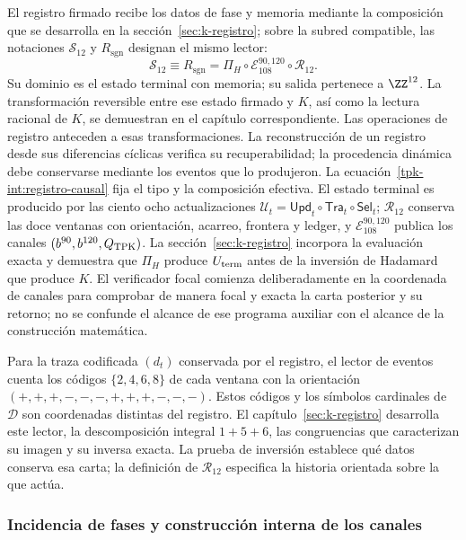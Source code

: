 El registro firmado recibe los datos de fase y memoria mediante la
composición que se desarrolla en la sección~\ref{sec:k-registro}; sobre la
subred compatible, las notaciones \(\mathcal S_{12}\) y
\(R_{\mathrm{sgn}}\) designan el mismo lector:
\begin{equation}
 \mathcal S_{12}\equiv R_{\mathrm{sgn}}
 =\Pi_H\circ\mathcal E_{108}^{90,120}
                         \circ\mathcal R_{12}.
 \label{tpk-int:registro-causal}
\end{equation}
Su dominio es el estado terminal con memoria; su salida pertenece a
\(\ZZ^{12}\). La transformación reversible entre ese estado firmado
y \(K\), así como la lectura racional de \(K\), se demuestran en
el capítulo correspondiente. Las operaciones de registro anteceden a
esas transformaciones. La reconstrucción de un registro desde sus
diferencias cíclicas verifica su recuperabilidad; la procedencia dinámica
debe conservarse mediante los eventos que lo produjeron.
La ecuación~\eqref{tpk-int:registro-causal} fija el tipo y la composición
efectiva. El estado terminal es producido por las ciento ocho actualizaciones
\(\mathcal U_t=\mathsf{Upd}_t\circ\mathsf{Tra}_t\circ\mathsf{Sel}_t\);
\(\mathcal R_{12}\) conserva las doce ventanas con orientación, acarreo,
frontera y ledger, y \(\mathcal E_{108}^{90,120}\) publica los canales
\((b^{90},b^{120},Q_{\rm TPK})\). La
sección~\ref{sec:k-registro} incorpora la evaluación exacta y demuestra que
\(\Pi_H\) produce \(U_{\rm term}\) antes de la inversión de Hadamard que
produce \(K\). El verificador focal comienza deliberadamente en la coordenada
de canales para comprobar de manera focal y exacta la carta posterior y su
retorno; no se confunde el alcance de ese programa auxiliar con el alcance de
la construcción matemática.

Para la traza codificada \((d_t)\) conservada por el registro, el
lector de eventos cuenta los códigos \(\{2,4,6,8\}\) de cada
ventana con la orientación
\((+,+,+,-,-,-,+,+,+,-,-,-)\). Estos códigos y los símbolos
cardinales de \(\mathcal D\) son coordenadas distintas del
registro. El capítulo~\ref{sec:k-registro} desarrolla este lector,
la descomposición integral \(1+5+6\), las congruencias que
caracterizan su imagen y su inversa exacta. La prueba de inversión
establece qué datos conserva esa carta; la definición de
\(\mathcal R_{12}\) especifica la historia orientada sobre la que
actúa.

\subsubsection{Incidencia de fases y construcción interna de los canales}
\label{tpk-int:incidencia}

